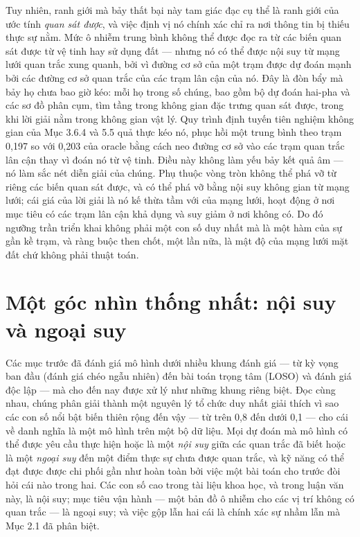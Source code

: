 Tuy nhiên, ranh giới mà bảy thất bại này tam giác đạc cụ thể là ranh giới của ước tính \emph{quan sát được}, và việc định vị nó chính xác chỉ ra nơi thông tin bị thiếu thực sự nằm. Mức ô nhiễm trung bình không thể được đọc ra từ các biến quan sát được từ vệ tinh hay sử dụng đất --- nhưng nó có thể được nội suy từ mạng lưới quan trắc xung quanh, bởi vì đường cơ sở của một trạm được dự đoán mạnh bởi các đường cơ sở quan trắc của các trạm lân cận của nó. Đây là đòn bẩy mà bảy họ chưa bao giờ kéo: mỗi họ trong số chúng, bao gồm bộ dự đoán hai-pha và các sơ đồ phân cụm, tìm tầng trong không gian đặc trưng quan sát được, trong khi lời giải nằm trong không gian vật lý. Quy trình định tuyến tiên nghiệm không gian của Mục 3.6.4 và 5.5 quả thực kéo nó, phục hồi một trung bình theo trạm 0,197 so với 0,203 của oracle bằng cách neo đường cơ sở vào các trạm quan trắc lân cận thay vì đoán nó từ vệ tinh. Điều này không làm yếu bảy kết quả âm --- nó làm sắc nét diễn giải của chúng. Phụ thuộc vòng tròn không thể phá vỡ từ riêng các biến quan sát được, và có thể phá vỡ bằng nội suy không gian từ mạng lưới; cái giá của lời giải là nó kế thừa tầm với của mạng lưới, hoạt động ở nơi mục tiêu có các trạm lân cận khả dụng và suy giảm ở nơi không có. Do đó ngưỡng trần triển khai không phải một con số duy nhất mà là một hàm của sự gần kề trạm, và ràng buộc then chốt, một lần nữa, là mật độ của mạng lưới mặt đất chứ không phải thuật toán.


\section{Một góc nhìn thống nhất: nội suy và ngoại suy}

Các mục trước đã đánh giá mô hình dưới nhiều khung đánh giá --- từ kỳ vọng ban đầu (đánh giá chéo ngẫu nhiên) đến bài toán trọng tâm (LOSO) và đánh giá độc lập --- mà cho đến nay được xử lý như những khung riêng biệt. Đọc cùng nhau, chúng phân giải thành một nguyên lý tổ chức duy nhất giải thích vì sao các con số nổi bật biến thiên rộng đến vậy --- từ trên 0,8 đến dưới 0,1 --- cho cái về danh nghĩa là một mô hình trên một bộ dữ liệu. Mọi dự đoán mà mô hình có thể được yêu cầu thực hiện hoặc là một \emph{nội suy} giữa các quan trắc đã biết hoặc là một \emph{ngoại suy} đến một điểm thực sự chưa được quan trắc, và kỹ năng có thể đạt được được chi phối gần như hoàn toàn bởi việc một bài toán cho trước đòi hỏi cái nào trong hai. Các con số cao trong tài liệu khoa học, và trong luận văn này, là nội suy; mục tiêu vận hành --- một bản đồ ô nhiễm cho các vị trí không có quan trắc --- là ngoại suy; và việc gộp lẫn hai cái là chính xác sự nhầm lẫn mà Mục 2.1 đã phân biệt.

